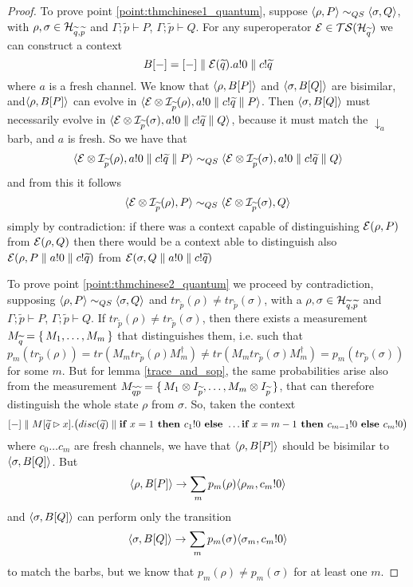 \begin{proof}
 To prove point \ref{point:thmchinese1_quantum}, suppose $\langle\rho, P\rangle \sim_{QS} \langle\sigma, Q\rangle$, with $\rho, \sigma \in \mathcal{H}_{\widetilde{q},\widetilde{p}}$ and $\Gamma;\widetilde{p} \vdash P$, $\Gamma;\widetilde{p} \vdash Q$.  For any superoperator $\mathcal{E} \in \mathcal{TS}(\mathcal{H}_{\widetilde{q}})$ we can construct a context $$B[{-}] = [{-}] \parallel \mathcal{E}({\widetilde{q}}).a!0 \parallel c!\widetilde{q}$$ where $a$ is a fresh channel. We know that $\langle\rho, B[P]\rangle$ and $\langle\sigma, B[Q]\rangle$ are bisimilar, and$\langle\rho, B[P]\rangle$ can evolve in $\langle\mathcal{E}\otimes\mathcal{I}_{\widetilde{p}}(\rho), a!0 \parallel c!\widetilde{q} \parallel P\rangle$. Then $\langle\sigma, B[Q]\rangle$ must necessarily evolve in $\langle\mathcal{E}\otimes \mathcal{I}_{\widetilde{p}}(\sigma), a!0 \parallel c!\widetilde{q} \parallel Q\rangle$, because it must match the $\downarrow_a$ barb, and $a$ is fresh. So we have that  
\[ \langle\mathcal{E}\otimes\mathcal{I}_{\widetilde{p}}(\rho), a!0 \parallel c!\widetilde{q} \parallel P\rangle \sim_{QS} 
  \langle\mathcal{E}\otimes \mathcal{I}_{\widetilde{p}}(\sigma), a!0 \parallel c!\widetilde{q} \parallel Q\rangle
\]
and from this it follows 
\[ \langle\mathcal{E}\otimes\mathcal{I}_{\widetilde{p}}(\rho), P\rangle \sim_{QS} 
  \langle\mathcal{E}\otimes \mathcal{I}_{\widetilde{p}}(\sigma), Q\rangle
\] simply by contradiction: if there was a context capable of distinguishing $\mathcal{E}(\rho, P)$ from $\mathcal{E}(\rho, Q)$ then there would be a context able to distinguish also $\mathcal{E}(\rho, P \parallel a!0 \parallel c!\widetilde{q})$ from $\mathcal{E}(\sigma, Q \parallel a!0 \parallel c!\widetilde{q})$

To prove point \ref{point:thmchinese2_quantum} we proceed by contradiction, supposing  $\langle\rho, P\rangle \sim_{QS} \langle\sigma, Q\rangle$  and $tr_{\widetilde{p}}(\rho) \neq tr_{\widetilde{p}}(\sigma)$, with a $\rho, \sigma \in \mathcal{H}_{\widetilde{q}, \widetilde{p}}$ and $\Gamma;\widetilde{p} \vdash P$, $\Gamma;\widetilde{p} \vdash Q$.
 If $tr_{\widetilde{p}}(\rho) \neq tr_{\widetilde{p}}(\sigma)$, then there exists a measurement $M_{\widetilde{q}} = \set{M_1, \ldots ,M_{m}}$ that distinguishes them, i.e. such that $p_m(tr_{\widetilde{p}}(\rho)) = tr(M_m tr_{\widetilde{p}}(\rho) M_m^\dagger) \neq tr(M_m tr_{\widetilde{p}}(\sigma) M_m^\dagger) = p_m(tr_{\widetilde{p}}(\sigma))$ for some $m$. But for lemma \ref{trace_and_sop}, the same probabilities arise also from the measurement $M_{\widetilde{q}\widetilde{p}} = \set{M_1 \otimes I_{\widetilde{p}}, \ldots , M_m \otimes I_{\widetilde{p}}}$, that  can therefore distinguish the whole state $\rho$ from $\sigma$. So, taken the context 
\[[{-}] \parallel M[\widetilde{q} \rhd x].\big(disc(\widetilde{q}) \parallel \textbf{if } x = 1 \textbf{ then } c_1!0 \textbf{ else } \ldots \textbf{if } x = m-1 \textbf{ then } c_{m-1}!0 \textbf{ else } c_m!0\big) \]
where $c_0 \ldots c_m$ are fresh channels, we have that $\langle\rho, B[P]\rangle$ should be bisimilar to $\langle\sigma, B[Q]\rangle$. But 
\[\langle\rho, B[P]\rangle \rightarrow \sum_m p_m(\rho) \langle\rho_m, c_m!0\rangle\]
and $\langle\sigma, B[Q]\rangle$ can perform only the transition \[\langle\sigma, B[Q]\rangle \rightarrow \sum_m p_m(\sigma) \langle\sigma_m, c_m!0\rangle\] to match the barbs, but we know that $p_m(\rho) \neq p_m(\sigma)$ for at least one $m$.
\end{proof}

